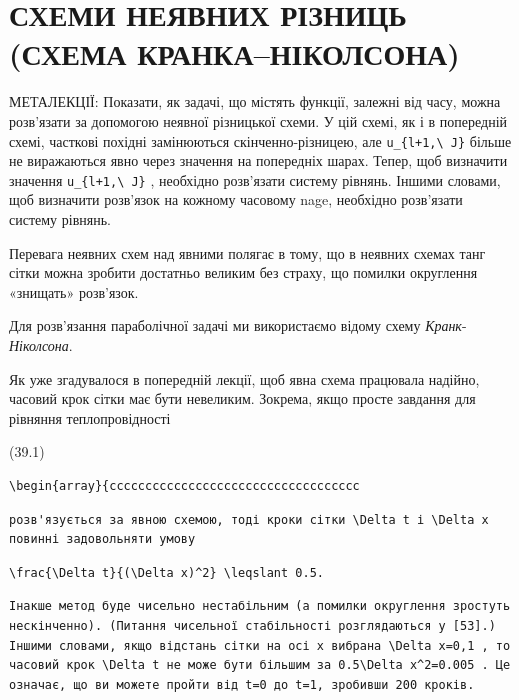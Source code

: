 \documentclass[
  ukrainian,
]{article}
\begin{document}
\section{СХЕМИ НЕЯВНИХ РІЗНИЦЬ (СХЕМА
КРАНКА--НІКОЛСОНА)}\label{ux441ux445ux435ux43cux438-ux43dux435ux44fux432ux43dux438ux445-ux440ux456ux437ux43dux438ux446ux44c-ux441ux445ux435ux43cux430-ux43aux440ux430ux43dux43aux430ux43dux456ux43aux43eux43bux441ux43eux43dux430}

МЕТАЛЕКЦІЇ: Показати, як задачі, що містять функції, залежні від часу,
можна розв'язати за допомогою неявної різницької схеми. У цій схемі, як
і в попередній схемі, часткові похідні замінюються скінченно-різницею,
але \texttt{u\_\{l+1,\textbackslash{}\ J\}} більше не виражаються явно
через значення на попередніх шарах. Тепер, щоб визначити значення
\texttt{u\_\{l+1,\textbackslash{}\ J\}} , необхідно розв'язати систему
рівнянь. Іншими словами, щоб визначити розв'язок на кожному часовому
nage, необхідно розв'язати систему рівнянь.

Перевага неявних схем над явними полягає в тому, що в неявних схемах
танг сітки можна зробити достатньо великим без страху, що помилки
округлення «знищать» розв'язок.

Для розв'язання параболічної задачі ми використаємо відому схему
\emph{Кранк}-\emph{Ніколсона}.

Як уже згадувалося в попередній лекції, щоб явна схема працювала
надійно, часовий крок сітки має бути невеликим. Зокрема, якщо просте
завдання для рівняння теплопровідності

(39.1)

\begin{verbatim}
\begin{array}{ccccccccccccccccccccccccccccccccccc
\end{verbatim}

\begin{verbatim}
розв'язується за явною схемою, тоді кроки сітки \Delta t і \Delta x повинні задовольняти умову
\end{verbatim}

\begin{verbatim}
\frac{\Delta t}{(\Delta x)^2} \leqslant 0.5.
\end{verbatim}

\begin{verbatim}
Інакше метод буде чисельно нестабільним (а помилки округлення зростуть нескінченно). (Питання чисельної стабільності розглядаються у [53].) Іншими словами, якщо відстань сітки на осі x вибрана \Delta x=0,1 , то часовий крок \Delta t не може бути більшим за 0.5\Delta x^2=0.005 . Це означає, що ви можете пройти від t=0 до t=1, зробивши 200 кроків.
\end{verbatim}
\end{document}
